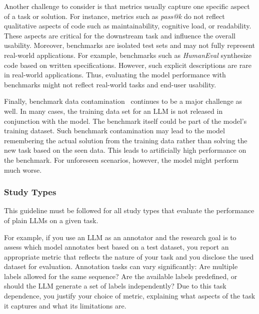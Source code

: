 Another challenge to consider is that metrics usually capture one specific aspect of a task or solution.
For instance, metrics such as \emph{pass@k} do not reflect qualitative aspects of code such as maintainability, cognitive load, or readability.
These aspects are critical for the downstream task and influence the overall usability.
Moreover, benchmarks are isolated test sets and may not fully represent real-world applications.
For example, benchmarks such as \emph{HumanEval} synthesize code based on written specifications.
However, such explicit descriptions are rare in real-world applications.
Thus, evaluating the model performance with benchmarks might not reflect real-world tasks and end-user usability.

Finally, benchmark data contamination~\cite{DBLP:journals/corr/abs-2406-04244} continues to be a major challenge as well.
In many cases, the training data set for an LLM is not released in conjunction with the model.
The benchmark itself could be part of the model's training dataset.
Such benchmark contamination may lead to the model remembering the actual solution from the training data rather than solving the new task based on the seen data.
This leads to artificially high performance on the benchmark.
For unforeseen scenarios, however, the model might perform much worse.



\subsubsection{Study Types}


This guideline must be followed for all study types that evaluate the performance of plain LLMs on a given task.

For example, if you use an LLM as an annotator and the research goal is to assess which model annotates best based on a test dataset, you \must report an appropriate metric that reflects the nature of your task and you \should disclose the used dataset for evaluation.
Annotation tasks can vary significantly: Are multiple labels allowed for the same sequence? Are the available labels predefined, or should the LLM generate a set of labels independently?
Due to this task dependence, you \should justify your choice of metric, explaining what aspects of the task it captures and what its limitations are.

